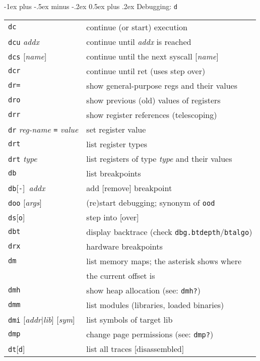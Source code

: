 \documentclass[a4paper,landscape]{article}
\makeatletter
\renewcommand{\section}{\@startsection{section}{1}{0mm}%
                                {-1ex plus -.5ex minus -.2ex}%
                                {0.5ex plus .2ex}%
                                {\normalfont\large\bfseries}}
\makeatother
\begin{document}
\begin{multicols*}{3}
\section{Debugging: \texttt{d}}
\begin{tabular}{@{}ll@{}}
\texttt{dc} & continue (or start) execution \\
\texttt{dcu} \textit{addx} & continue until \textit{addx} is reached \\
\texttt{dcs} [\textit{name}] & continue until the next syscall [\textit{name}] \\
\texttt{dcr} & continue until ret (uses step over) \\
\texttt{dr=} & show general-purpose regs and their values \\
\texttt{dro} & show previous (old) values of registers \\
\texttt{drr} & show register references (telescoping) \\
\texttt{dr} \textit{reg-name} \texttt{=} \textit{value} & set register value \\
\texttt{drt} & list register types \\
\texttt{drt} \textit{type} & list registers of type \textit{type} and their values \\
\texttt{db} & list breakpoints \\
\texttt{db}[\texttt{-}]\ \textit{addx} & add [remove] breakpoint \\
\texttt{doo} [\textit{args}] & (re)start debugging; synonym of \texttt{ood}\\
\texttt{ds}[\texttt{o}] & step into [over]\\
\texttt{dbt} & display backtrace (check \texttt{dbg.btdepth}/\texttt{btalgo}) \\
\texttt{drx} & hardware breakpoints \\
\texttt{dm} & list memory maps; the asterisk shows where \\ & the current offset is \\
\texttt{dmh} & show heap allocation (see: \texttt{dmh?}) \\
\texttt{dmm} & list modules (libraries, loaded binaries) \\
\texttt{dmi} [\textit{addr}|\textit{lib}] [\textit{sym}] & list symbols of target lib \\
\texttt{dmp} & change page permissions (see: \texttt{dmp?}) \\
\texttt{dt}[\texttt{d}] & list all traces [disassembled]
\end{tabular}


\end{multicols*}
\end{document}
